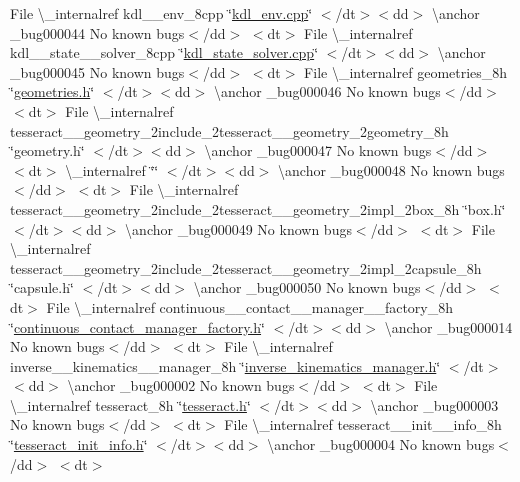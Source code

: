 \begin{DoxyRefList}
\+File \textbackslash{}\+\_\+internalref kdl\+\_\+\+\_\+env\+\_\+8cpp \char`\"{}\mbox{\hyperlink{kdl__env_8cpp}{kdl\+\_\+env.\+cpp}}\char`\"{} $<$/dt$>$$<$dd$>$ \textbackslash{}anchor \+\_\+bug000044 No known bugs$<$/dd$>$ $<$dt$>$
\+File \textbackslash{}\+\_\+internalref kdl\+\_\+\+\_\+state\+\_\+\+\_\+solver\+\_\+8cpp \char`\"{}\mbox{\hyperlink{kdl__state__solver_8cpp}{kdl\+\_\+state\+\_\+solver.\+cpp}}\char`\"{} $<$/dt$>$$<$dd$>$ \textbackslash{}anchor \+\_\+bug000045 No known bugs$<$/dd$>$ $<$dt$>$
\+File \textbackslash{}\+\_\+internalref geometries\+\_\+8h \char`\"{}\mbox{\hyperlink{geometries_8h}{geometries.\+h}}\char`\"{} $<$/dt$>$$<$dd$>$ \textbackslash{}anchor \+\_\+bug000046 No known bugs$<$/dd$>$ $<$dt$>$
\+File \textbackslash{}\+\_\+internalref tesseract\+\_\+\+\_\+geometry\+\_\+2include\+\_\+2tesseract\+\_\+\+\_\+geometry\+\_\+2geometry\+\_\+8h \char`\"{}geometry.\+h\char`\"{} $<$/dt$>$$<$dd$>$ \textbackslash{}anchor \+\_\+bug000047 No known bugs$<$/dd$>$ $<$dt$>$
 \textbackslash{}\+\_\+internalref  \char`\"{}\char`\"{} $<$/dt$>$$<$dd$>$ \textbackslash{}anchor \+\_\+bug000048 No known bugs$<$/dd$>$ $<$dt$>$
\+File \textbackslash{}\+\_\+internalref tesseract\+\_\+\+\_\+geometry\+\_\+2include\+\_\+2tesseract\+\_\+\+\_\+geometry\+\_\+2impl\+\_\+2box\+\_\+8h \char`\"{}box.\+h\char`\"{} $<$/dt$>$$<$dd$>$ \textbackslash{}anchor \+\_\+bug000049 No known bugs$<$/dd$>$ $<$dt$>$
\+File \textbackslash{}\+\_\+internalref tesseract\+\_\+\+\_\+geometry\+\_\+2include\+\_\+2tesseract\+\_\+\+\_\+geometry\+\_\+2impl\+\_\+2capsule\+\_\+8h \char`\"{}capsule.\+h\char`\"{} $<$/dt$>$$<$dd$>$ \textbackslash{}anchor \+\_\+bug000050 No known bugs$<$/dd$>$ $<$dt$>$
\+File \textbackslash{}\+\_\+internalref continuous\+\_\+\+\_\+contact\+\_\+\+\_\+manager\+\_\+\+\_\+factory\+\_\+8h \char`\"{}\mbox{\hyperlink{continuous__contact__manager__factory_8h}{continuous\+\_\+contact\+\_\+manager\+\_\+factory.\+h}}\char`\"{} $<$/dt$>$$<$dd$>$ \textbackslash{}anchor \+\_\+bug000014 No known bugs$<$/dd$>$ $<$dt$>$
\+File \textbackslash{}\+\_\+internalref inverse\+\_\+\+\_\+kinematics\+\_\+\+\_\+manager\+\_\+8h \char`\"{}\mbox{\hyperlink{inverse__kinematics__manager_8h}{inverse\+\_\+kinematics\+\_\+manager.\+h}}\char`\"{} $<$/dt$>$$<$dd$>$ \textbackslash{}anchor \+\_\+bug000002 No known bugs$<$/dd$>$ $<$dt$>$
\+File \textbackslash{}\+\_\+internalref tesseract\+\_\+8h \char`\"{}\mbox{\hyperlink{tesseract_8h}{tesseract.\+h}}\char`\"{} $<$/dt$>$$<$dd$>$ \textbackslash{}anchor \+\_\+bug000003 No known bugs$<$/dd$>$ $<$dt$>$
\+File \textbackslash{}\+\_\+internalref tesseract\+\_\+\+\_\+init\+\_\+\+\_\+info\+\_\+8h \char`\"{}\mbox{\hyperlink{tesseract__init__info_8h}{tesseract\+\_\+init\+\_\+info.\+h}}\char`\"{} $<$/dt$>$$<$dd$>$ \textbackslash{}anchor \+\_\+bug000004 No known bugs$<$/dd$>$ $<$dt$>$
$$
\end{DoxyRefList}
